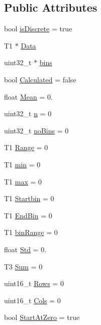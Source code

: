 \subsection*{Public Attributes}
\begin{DoxyCompactItemize}
\item 
bool \hyperlink{class_soil_math_1_1_stats_a2f54bbc8d815345b23ebbd4ba2b302bf}{is\+Discrete} = true
\item 
T1 $\ast$ \hyperlink{class_soil_math_1_1_stats_affce366ceab8419a3f732e3c3a358f65}{Data}
\item 
uint32\+\_\+t $\ast$ \hyperlink{class_soil_math_1_1_stats_a00778b298b1ebb335eb0c4eed69e471c}{bins}
\item 
bool \hyperlink{class_soil_math_1_1_stats_a3d3cd491b829b2e30f6752fee38fe261}{Calculated} = false
\item 
float \hyperlink{class_soil_math_1_1_stats_a6f53982d52cf492ddd4df9b56bd014e7}{Mean} = 0.
\item 
uint32\+\_\+t \hyperlink{class_soil_math_1_1_stats_a7bc57af334b68253832ebac17f85d091}{n} = 0
\item 
uint32\+\_\+t \hyperlink{class_soil_math_1_1_stats_a4202c9085eacaff2e04eda84fc90e92b}{no\+Bins} = 0
\item 
T1 \hyperlink{class_soil_math_1_1_stats_a7154ac6c97dc2e83bdff7fef3cbdac5b}{Range} = 0
\item 
T1 \hyperlink{class_soil_math_1_1_stats_aa44c07a23b1c2ce0f0407e7cee4f39a9}{min} = 0
\item 
T1 \hyperlink{class_soil_math_1_1_stats_ad49ee1f533564ec587cf98a094b8c564}{max} = 0
\item 
T1 \hyperlink{class_soil_math_1_1_stats_acf54f4a105482109ebc884c8e56d0ba9}{Startbin} = 0
\item 
T1 \hyperlink{class_soil_math_1_1_stats_a0db07157ff238d0d40c4e1f4d67afd46}{End\+Bin} = 0
\item 
T1 \hyperlink{class_soil_math_1_1_stats_a00be1d2a705a8aba532fbe726001bbb2}{bin\+Range} = 0
\item 
float \hyperlink{class_soil_math_1_1_stats_a6af590b7d033d882d5428c0d7a1f5e59}{Std} = 0.
\item 
T3 \hyperlink{class_soil_math_1_1_stats_af326fa61048522fc146b799759e345f9}{Sum} = 0
\item 
uint16\+\_\+t \hyperlink{class_soil_math_1_1_stats_a0e462c013f12f02e31e9ae03334151c3}{Rows} = 0
\item 
uint16\+\_\+t \hyperlink{class_soil_math_1_1_stats_a971f1ec23c32137805c4577f05454d83}{Cols} = 0
\item 
bool \hyperlink{class_soil_math_1_1_stats_a06f5e8404c2a0fa303dbb18a58d6deb5}{Start\+At\+Zero} = true
\end{DoxyCompactItemize}
